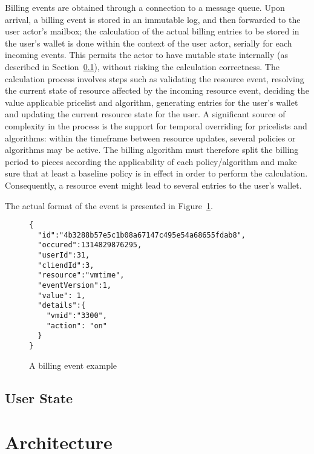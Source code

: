 \documentclass[preprint,10pt]{sigplanconf}
\begin{document}
Billing events are obtained through a connection to a message queue. Upon
arrival, a billing event is stored in an immutable log, and then forwarded to
the user actor's mailbox; the calculation of the actual billing entries to be
stored in the user's wallet is done within the context of the user actor,
serially for each incoming events. This permits the actor to have mutable state
internally (as described in Section~\ref{sec:ustate}), without risking the
calculation correctness. The calculation process involves steps such as
validating the resource event, resolving the current state of resource affected
by the incoming resource event, deciding the value applicable pricelist and
algorithm, generating entries for the user's wallet and updating the current
resource state for the user. A significant source of complexity in the process
is the support for temporal overriding for pricelists and algorithms: within
the timeframe between resource updates, several policies or algorithms may be
active. The billing algorithm must therefore split the billing period to pieces
according the applicability of each policy/algorithm and make sure that at 
least a baseline policy is in effect in order to perform the calculation.
Consequently, a resource event might lead to several entries to the user's wallet.

The actual format of the event is presented in Figure~\ref{fig:resevt}.

\begin{figure}
\lstset{language=C, basicstyle=\footnotesize,
stringstyle=\ttfamily, 
flexiblecolumns=true, aboveskip=-0.9em, belowskip=0em, lineskip=0em}

\begin{lstlisting}
{
  "id":"4b3288b57e5c1b08a67147c495e54a68655fdab8",
  "occured":1314829876295,
  "userId":31,
  "cliendId":3,
  "resource":"vmtime",
  "eventVersion":1,
  "value": 1,
  "details":{
    "vmid":"3300",
    "action": "on"
  }
}
\end{lstlisting}
\caption{A billing event example} 
\label{fig:resevt}

\end{figure}

\subsection{User State}
\label{sec:ustate}

\section{Architecture}

\end{document}
